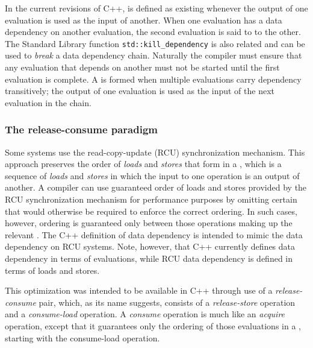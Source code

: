In the current revisions of C++,  is defined as
existing whenever the output of one evaluation is used as the input of
another.
 When one evaluation has a data dependency on another
evaluation, the second evaluation is said to 
to the other. The Standard Library function
\lstinline!std::kill_dependency! is also related and can be used to
  \emph{break} a data dependency chain. Naturally the compiler must
ensure that any evaluation that depends on another must not be started
until the first evaluation is complete. A 
is formed when multiple evaluations carry dependency transitively; the
output of one evaluation is used as the input of the next evaluation in
the chain.

\subsubsection[The release-consume paradigm]{The release-consume paradigm}\label{the-release-consume-paradigm}

Some systems use the read-copy-update (RCU) synchronization mechanism.
This approach preserves the order of \emph{loads} and \emph{stores} that
form in a , which is a sequence of
\emph{loads} and \emph{stores} in which the input to one operation is an
output of another. A compiler can use guaranteed order of loads
and stores provided by the RCU synchronization mechanism for performance purposes by omitting certain
 that would otherwise be required to
enforce the correct ordering. In such cases, however, ordering is
guaranteed only between those operations making up the relevant
. The C++ definition
of data dependency is intended to mimic the data dependency on RCU
systems. Note, however, that C++ currently defines data dependency in
terms of evaluations, while RCU data dependency is defined in terms of
  loads and stores.

This optimization was intended to be available in C++ through use of a
\emph{release-consume} pair, which, as its name
suggests, consists of a \emph{release-store} operation and a
\emph{consume-load} operation. A \emph{consume} operation is much like
an \emph{acquire} operation, except that it guarantees only the ordering
of those evaluations in a , starting with
the consume-load operation.

